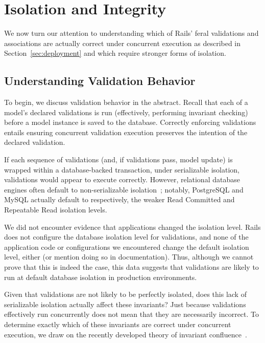 
\section{Isolation and Integrity}
\label{sec:apps}

We now turn our attention to understanding which of Rails' feral
validations and associations are actually correct under concurrent
execution as described in Section~\ref{sec:deployment} and which
require stronger forms of isolation.

\subsection{Understanding Validation Behavior}

To begin, we discuss validation behavior in the abstract. Recall that
each of a model's declared validations is run (effectively, performing
invariant checking) before a model instance is saved to the
database. Correctly enforcing validations entails ensuring concurrent
validation execution preserves the intention of the declared
validation.

 If each sequence of validations (and, if validations pass, model
update) is wrapped within a database-backed transaction, under
serializable isolation, validations would appear to execute
correctly. However, relational database engines often default to
non-serializable isolation~\cite{hat-vldb}; notably, PostgreSQL and
MySQL actually default to respectively, the weaker Read Committed and
Repeatable Read isolation levels.

We did not encounter evidence that applications changed the isolation
level. Rails does not configure the database isolation level for
validations, and none of the application code or configurations we
encountered change the default isolation level, either (or mention
doing so in documentation). Thus, although we cannot prove that this
is indeed the case, this data suggests that validations are likely
to run at default database isolation in production environments.

 Given that validations are
not likely to be perfectly isolated, does this lack of serializable
isolation actually affect these invariants?  Just because validations
effectively run concurrently does not mean that they are necessarily
incorrect. To determine exactly which of these invariants are correct
under concurrent execution, we draw on the recently developed theory
of invariant confluence~\cite{coord-avoid}.

